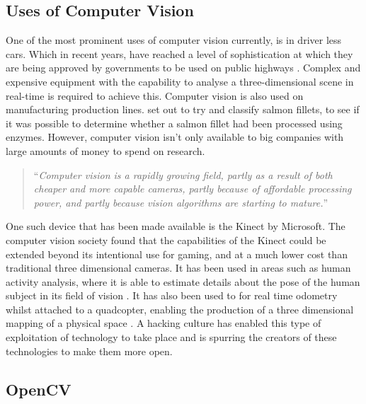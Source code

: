 \documentclass[11pt,oneside]{report}
\begin{document}
			\subsection{Uses of Computer Vision}
				One of the most prominent uses of computer vision currently, is in driver less cars.
				Which in recent years, have reached a level of sophistication at which they are being approved by governments to be used on public highways \cite{web:driverlessCars}.
				Complex and expensive equipment with the capability to analyse a three-dimensional scene in real-time is required to achieve this.
				Computer vision is also used on manufacturing production lines.
				 set out to try and classify salmon fillets, to see if it was possible to determine whether a salmon fillet had been processed using enzymes. %
				However, computer vision isn't only available to big companies with large amounts of money to spend on research.
				\begin{quote}
				``\textit{Computer vision is a rapidly growing field, partly as a result of both cheaper and more capable cameras, partly because of affordable processing power, and partly because vision algorithms are starting to mature.}''\cite[p. ix]{definition:cv}
				\end{quote}
				One such device that has been made available is the Kinect by Microsoft.
				The computer vision society found that the capabilities of the Kinect could be extended beyond its intentional use for gaming, and at a much lower cost than traditional three dimensional cameras.
				It has been used in areas such as human activity analysis, where it is able to estimate details about the pose of the human subject in its field of vision \cite{kinect:1}.
				It has also been used to for real time odometry whilst attached to a quadcopter, enabling the production of a three dimensional mapping of a physical space \cite{kinect:2}.
				A hacking culture has enabled this type of exploitation of technology to take place and is spurring the creators of these technologies to make them more open.
				
			\subsection{OpenCV}
			
\end{document}
